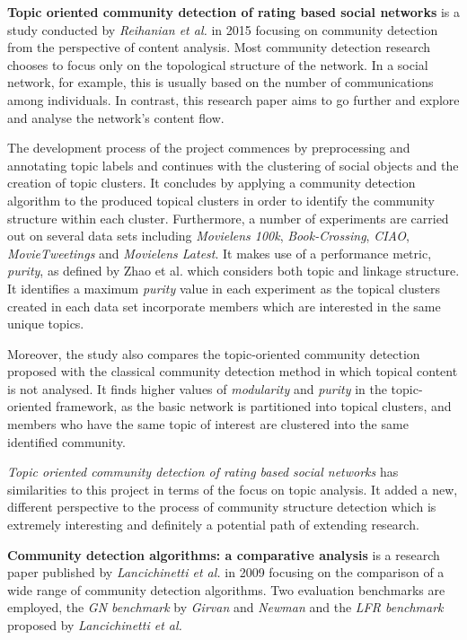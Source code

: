 \vspace*{1em}

\textbf{Topic oriented community detection of rating based social networks} is a study conducted by \textit{Reihanian et al.} \cite{reihanian2015topic} in 2015 focusing on community detection from the perspective of content analysis. Most community detection research chooses to focus only on the topological structure of the network. In a social network, for example, this is usually based on the number of communications among individuals. In contrast, this research paper aims to go further and explore and analyse the network's content flow.

The development process of the project commences by preprocessing and annotating topic labels and continues with the clustering of social objects and the creation of topic clusters. It concludes by applying a community detection algorithm to the produced topical clusters in order to identify the community structure within each cluster. Furthermore, a number of experiments are carried out on several data sets including \textit{Movielens 100k}, \textit{Book-Crossing}, \textit{CIAO}, \textit{MovieTweetings} and \textit{Movielens Latest}. It makes use of a performance metric, \textit{purity}, as defined by Zhao et al. \cite{zhao2012topic} which considers both topic and linkage structure. It identifies a maximum \textit{purity} value in each experiment as the topical clusters created in each data set incorporate members which are interested in the same unique topics.

Moreover, the study also compares the topic-oriented community detection proposed with the classical community detection method in which topical content is not analysed. It finds higher values of \textit{modularity} and \textit{purity} in the topic-oriented framework, as the basic network is partitioned into topical clusters, and members who have the same topic of interest are clustered into the same identified community.

\textit{Topic oriented community detection of rating based social networks} has similarities to this project in terms of the focus on topic analysis. It added a new, different perspective to the process of community structure detection which is extremely interesting and definitely a potential path of extending research.

\vspace*{1em}

\textbf{Community detection algorithms: a comparative analysis} is a research paper published by \textit{Lancichinetti et al.} \cite{lancichinetti2009community} in 2009 focusing on the comparison of a wide range of community detection algorithms. Two evaluation benchmarks are employed, the \textit{GN benchmark} by \textit{Girvan} and \textit{Newman} and the \textit{LFR benchmark} proposed by \textit{Lancichinetti et al.}

